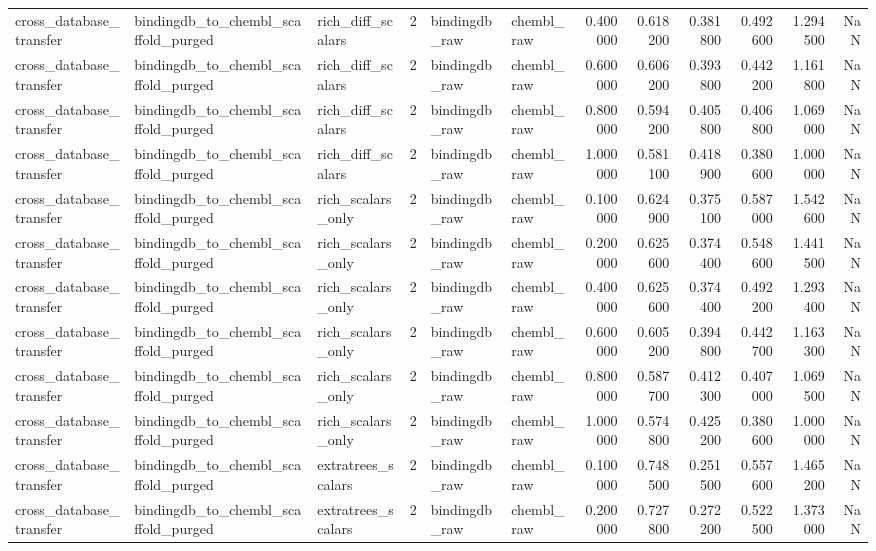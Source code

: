 \begin{longtable}{lllrllrrrrrr}
cross\_database\_transfer & bindingdb\_to\_chembl\_scaffold\_purged & rich\_diff\_scalars & 2 & bindingdb\_raw & chembl\_raw & 0.400000 & 0.618200 & 0.381800 & 0.492600 & 1.294500 & NaN \\
cross\_database\_transfer & bindingdb\_to\_chembl\_scaffold\_purged & rich\_diff\_scalars & 2 & bindingdb\_raw & chembl\_raw & 0.600000 & 0.606200 & 0.393800 & 0.442200 & 1.161800 & NaN \\
cross\_database\_transfer & bindingdb\_to\_chembl\_scaffold\_purged & rich\_diff\_scalars & 2 & bindingdb\_raw & chembl\_raw & 0.800000 & 0.594200 & 0.405800 & 0.406800 & 1.069000 & NaN \\
cross\_database\_transfer & bindingdb\_to\_chembl\_scaffold\_purged & rich\_diff\_scalars & 2 & bindingdb\_raw & chembl\_raw & 1.000000 & 0.581100 & 0.418900 & 0.380600 & 1.000000 & NaN \\
cross\_database\_transfer & bindingdb\_to\_chembl\_scaffold\_purged & rich\_scalars\_only & 2 & bindingdb\_raw & chembl\_raw & 0.100000 & 0.624900 & 0.375100 & 0.587000 & 1.542600 & NaN \\
cross\_database\_transfer & bindingdb\_to\_chembl\_scaffold\_purged & rich\_scalars\_only & 2 & bindingdb\_raw & chembl\_raw & 0.200000 & 0.625600 & 0.374400 & 0.548600 & 1.441500 & NaN \\
cross\_database\_transfer & bindingdb\_to\_chembl\_scaffold\_purged & rich\_scalars\_only & 2 & bindingdb\_raw & chembl\_raw & 0.400000 & 0.625600 & 0.374400 & 0.492200 & 1.293400 & NaN \\
cross\_database\_transfer & bindingdb\_to\_chembl\_scaffold\_purged & rich\_scalars\_only & 2 & bindingdb\_raw & chembl\_raw & 0.600000 & 0.605200 & 0.394800 & 0.442700 & 1.163300 & NaN \\
cross\_database\_transfer & bindingdb\_to\_chembl\_scaffold\_purged & rich\_scalars\_only & 2 & bindingdb\_raw & chembl\_raw & 0.800000 & 0.587700 & 0.412300 & 0.407000 & 1.069500 & NaN \\
cross\_database\_transfer & bindingdb\_to\_chembl\_scaffold\_purged & rich\_scalars\_only & 2 & bindingdb\_raw & chembl\_raw & 1.000000 & 0.574800 & 0.425200 & 0.380600 & 1.000000 & NaN \\
cross\_database\_transfer & bindingdb\_to\_chembl\_scaffold\_purged & extratrees\_scalars & 2 & bindingdb\_raw & chembl\_raw & 0.100000 & 0.748500 & 0.251500 & 0.557600 & 1.465200 & NaN \\
cross\_database\_transfer & bindingdb\_to\_chembl\_scaffold\_purged & extratrees\_scalars & 2 & bindingdb\_raw & chembl\_raw & 0.200000 & 0.727800 & 0.272200 & 0.522500 & 1.373000 & NaN \\

\end{longtable}
